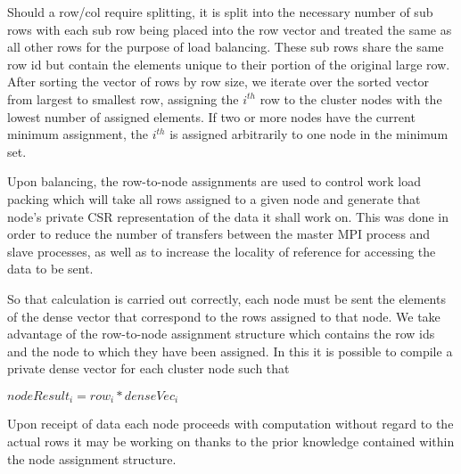 Should a row/col require splitting, it is split into the necessary number of sub rows with each sub row being placed into the row vector and treated the same as all other rows for the purpose of load balancing. These sub rows share the same row id but contain the elements unique to their portion of the original large row. After sorting the vector of rows by row size, we iterate over the sorted vector from largest to smallest row, assigning the $i^{th}$ row to the cluster nodes with the lowest number of assigned elements. If two or more nodes have the current minimum assignment, the $i^{th}$ is assigned arbitrarily to one node in the minimum set. 

Upon balancing, the row-to-node assignments are used to control work load packing which will take all rows assigned to a given node and generate that node's private CSR representation of the data it shall work on. This was done in order to reduce the number of transfers between the master MPI process and slave processes, as well as to increase the locality of reference for accessing the data to be sent. 

So that calculation is carried out correctly, each node must be sent the elements of the dense vector that correspond to the rows assigned to that node. We take advantage of the row-to-node assignment structure which contains the row ids and the node to which they have been assigned. In this it is possible to compile a private dense vector for each cluster node such that 

\medskip
\begin{center}
	$nodeResult_i = row_i * denseVec_i$
\end{center}
\medskip

Upon receipt of data each node proceeds with computation without regard to the actual rows it may be working on thanks to the prior knowledge contained within the node assignment structure. 

%
%


